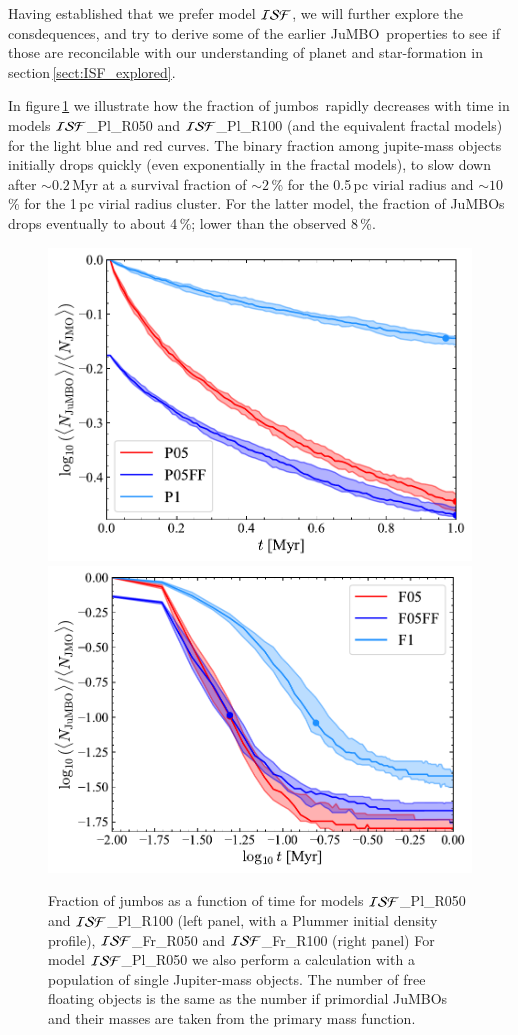 \documentclass[submission,phys]{lib/SciPost}
\newcommand{\jumbo}{\mbox{JuMBO}}
\newcommand{\jumbos}{\mbox{JuMBOs}}
\begin{document}
Having established that we prefer model ${\cal ISF}$, we will further
explore the consdequences, and try to derive some of the earlier
\jumbo\, properties to see if those are reconcilable with our
understanding of planet and star-formation in
section\,\ref{sect:ISF_explored}.

In figure\,\ref{Fig:Fjumbo_vs_time_model_ISF_Fr} we illustrate how the
fraction of jumbos\, rapidly decreases with time in models ${\cal
  ISF}$\_Pl\_R050 and ${\cal ISF}$\_Pl\_R100 (and the equivalent
fractal models) for the light blue and red curves.  The binary
fraction among jupite-mass objects initially drops quickly (even
exponentially in the fractal models), to slow down after $\sim
0.2$\,Myr at a survival fraction of $\sim 2$\,\% for the 0.5\,pc
virial radius and $\sim 10$\,\% for the 1\,pc virial radius
cluster. For the latter model, the fraction of \jumbos\, drops
eventually to about 4\,\%; lower than the observed 8\,\%.

\begin{figure}
    \centering
    \includegraphics[width=0.49\columnwidth]{figures/Plummer_General_fJuMBO_evol.pdf}
    \includegraphics[width=0.49\columnwidth]{figures/Fractal_General_fJuMBO_evol.pdf}
    \caption{Fraction of jumbos as a function of time for models
      ${\cal ISF}$\_Pl\_R050 and ${\cal ISF}$\_Pl\_R100 (left panel,
      with a Plummer initial density profile), ${\cal ISF}$\_Fr\_R050
      and ${\cal ISF}$\_Fr\_R100 (right panel) For model ${\cal
        ISF}$\_Pl\_R050 we also perform a calculation with a
      population of single Jupiter-mass objects. The number of free
      floating objects is the same as the number if primordial
      \jumbos\, and their masses are taken from the primary mass
      function.
}
        \label{Fig:Fjumbo_vs_time_model_ISF_Pl}
        \label{Fig:Fjumbo_vs_time_model_ISF_Fr}
\end{figure}
\end{document}
